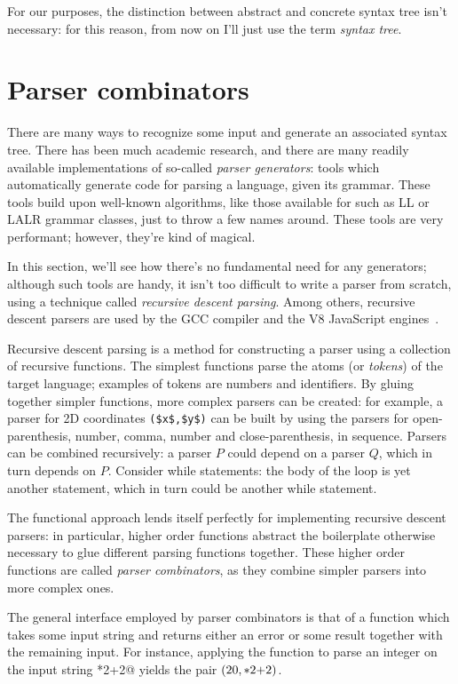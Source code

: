 \documentclass[UdineBachThesis,american,11pt,draft]{PhdThesis}
\begin{document}
  For our purposes, the distinction between abstract and concrete syntax tree
  isn't necessary: for this reason, from now on I'll just use the term
  \emph{syntax tree}.

  \section{Parser combinators}

  There are many ways to recognize some input and generate an associated syntax
  tree. There has been much academic research, and there are many readily
  available implementations of so-called \emph{parser generators}: tools which
  automatically generate code for parsing a language, given its grammar. These
  tools build upon well-known algorithms, like those available for such as LL or
  LALR grammar classes, just to throw a few names around. These tools are very
  performant; however, they're kind of magical.

  In this section, we'll see how there's no fundamental need for any generators;
  although such tools are handy, it isn't too difficult to write a parser from
  scratch, using a technique called \emph{recursive descent parsing}. Among
  others, recursive descent parsers are used by the GCC compiler and the V8
  JavaScript engines~\cite{nystrom}.

  Recursive descent parsing is a method for constructing a parser using a
  collection of recursive functions. The simplest functions parse the atoms (or
  \emph{tokens}) of the target language; examples of tokens are numbers and
  identifiers. By gluing together simpler functions, more complex parsers can be
  created: for example, a parser for 2D coordinates
  \lstinline[mathescape]@($x$,$y$)@ can be built by using the parsers for
  open-parenthesis, number, comma, number and close-parenthesis, in sequence.
  Parsers can be combined recursively: a parser $P$ could depend on a parser
  $Q$, which in turn depends on $P$\@. Consider while statements: the body of
  the loop is yet another statement, which in turn could be another while
  statement.

  The functional approach lends itself perfectly for implementing recursive
  descent parsers: in particular, higher order functions abstract the
  boilerplate otherwise necessary to glue different parsing functions together.
  These higher order functions are called \emph{parser combinators}, as they
  combine simpler parsers into more complex ones.

  The general interface employed by parser combinators is that of a function
  which takes some input string and returns either an error or some result
  together with the remaining input. For instance, applying the function to
  parse an integer on the input string *2+2@ yields the pair
  $\left(20, \text{\lstinline@*2+2@}\right)$.
\end{document}
